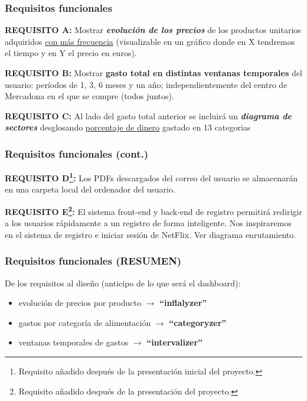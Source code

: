 \documentclass{beamer}
\begin{document}
	
			\begin{frame}
				\frametitle{Requisitos funcionales}
				
				
				\textbf{REQUISITO A:} Mostrar\textbf{ \textit{evolución de los precios}} de los productos unitarios adquiridos \underline{con más frecuencia} (visualizable en un gráfico donde en X tendremos el tiempo y en Y el precio en euros).
				
				\textbf{REQUISITO B:} Mostrar {\textbf{gasto total en distintas ventanas temporales}} del usuario: períodos de 1, 3, 6 meses y un año; independientemente del centro de Mercadona en el que se compre (todos juntos).
				
				\textbf{REQUISITO C:} Al lado del gasto total anterior se incluirá un \textbf{\textit{diagrama de sectores}} desglosando \underline{porcentaje de dinero} gastado en 13 categorias \href{https://shorturl.at/whzPf}{\color{blue}{(click para ver categorías)}}
				
			\end{frame}
			
			
			
						
			\begin{frame}
				\frametitle{Requisitos funcionales (cont.)}
				
			
				
				\textbf{REQUISITO D\footnote{Requisito añadido después de la presentación inicial del proyecto.}:} Los PDFs descargados del correo del usuario se almacenarán en una carpeta local del ordenador del usuario.
				
				\textbf{REQUISITO E\footnote{Requisito añadido después de la presentación del proyecto.}:} El sistema front-end y back-end de registro permitirá redirigir a los usuarios rápidamente a un registro de forma inteligente. Nos inspiraremos en el sistema de  registro e iniciar sesión de NetFlix. Ver diagrama enrutamiento.

			\end{frame}
		
		
		
								
			\begin{frame}
				\frametitle{Requisitos funcionales (RESUMEN)}
				
				
				De los requisitos al diseño (anticipo de lo que será el dashboard):
			
				\begin{itemize}
					\item evolución de precios por producto $\rightarrow$ \textbf{``inflalyzer''}
					\item gastos por categoría de alimentación $\rightarrow$  \textbf{``categoryzer''}
					\item ventanas temporales de gastos $\rightarrow$  \textbf{``intervalizer''}
				\end{itemize}
				
			\end{frame}
		
\end{document}
